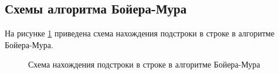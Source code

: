 \documentclass[a4paper, 14pt]{article}
\begin{document}
        \subsection{Схемы алгоритма Бойера-Мура}\label{vstad}
        На рисунке \ref{fig:shift} приведена схема нахождения подстроки в строке в алгоритме Бойера-Мура.\\
       \begin{figure}[h]
        	\caption{Схема нахождения подстроки в строке в алгоритме Бойера-Мура}
        	\label{fig:shift}
        \end{figure} 
        \newpage   
\end{document}
